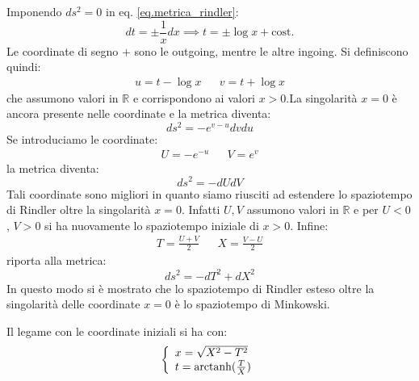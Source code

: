 Imponendo $ds^2=0$ in eq. \ref{eq.metrica_rindler}:
\begin{equation*}
    dt = \pm\frac{1}{x}dx \implies t= \pm \log x + \textrm{cost.}
\end{equation*}
Le coordinate di segno $+$ sono le outgoing, mentre le altre ingoing. Si definiscono quindi:
\begin{align*}
    u= t - \log x && v= t+ \log x
\end{align*}
che assumono valori in $\mathbb{R}$ e corrispondono ai valori $x>0$.La singolarità $x=0$ è ancora presente nelle coordinate e la metrica diventa:
\begin{equation*}
    ds^2 = - e^{v-u}dvdu
\end{equation*}
Se introduciamo le coordinate:
\begin{align*}
    U = -e^{-u} && V = e^{v}
\end{align*}
la metrica diventa:
\begin{equation*}
    ds^2 = -dUdV
\end{equation*}
Tali coordinate sono migliori in quanto siamo riusciti ad estendere lo spaziotempo di Rindler oltre la singolarità $x=0$. Infatti $U, V$ assumono valori in $\mathbb{R}$ e per $U<0$, $V>0$ si ha nuovamente lo spaziotempo iniziale di $x>0$. Infine:
\begin{align*}
    T= \frac{U+V}{2} && X= \frac{V-U}{2}
\end{align*}
riporta alla metrica:
\begin{equation*}
    ds^2 = -dT^2 + dX^2
\end{equation*}
In questo modo si è mostrato che lo spaziotempo di Rindler esteso oltre la singolarità delle coordinate $x=0$ è lo spaziotempo di Minkowski.

Il legame con le coordinate iniziali si ha con:
\begin{equation*}
    \left\{\begin{array}{l}
        x = \sqrt{X^2 - T^2} \\
        t = \operatorname{arctanh}(\frac{T}{X})
    \end{array}\right.
\end{equation*}
